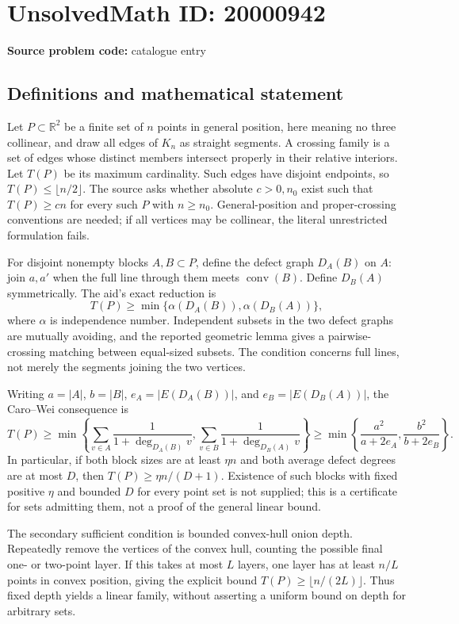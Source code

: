 \documentclass[11pt]{article}
\newcommand{\R}{\mathbb{R}}
\begin{document}
\section*{UnsolvedMath ID: 20000942}
\textbf{Source problem code:} catalogue entry
\subsection{Definitions and mathematical statement}
Let \(P\subset\R^2\) be a finite set of \(n\) points in general position, here meaning no three collinear, and draw all edges of \(K_n\) as straight segments. A crossing family is a set of edges whose distinct members intersect properly in their relative interiors. Let \(T(P)\) be its maximum cardinality. Such edges have disjoint endpoints, so \(T(P)\leq\lfloor n/2\rfloor\). The source asks whether absolute \(c>0,n_0\) exist such that \(T(P)\geq cn\) for every such \(P\) with \(n\geq n_0\). General-position and proper-crossing conventions are needed; if all vertices may be collinear, the literal unrestricted formulation fails.

For disjoint nonempty blocks \(A,B\subset P\), define the defect graph \(D_A(B)\) on \(A\): join \(a,a'\) when the full line through them meets \(\operatorname{conv}(B)\). Define \(D_B(A)\) symmetrically. The aid's exact reduction is
\[
 T(P)\geq\min\{\alpha(D_A(B)),\alpha(D_B(A))\},
\]
where \(\alpha\) is independence number. Independent subsets in the two defect graphs are mutually avoiding, and the reported geometric lemma gives a pairwise-crossing matching between equal-sized subsets. The condition concerns full lines, not merely the segments joining the two vertices.

Writing \(a=|A|\), \(b=|B|\), \(e_A=|E(D_A(B))|\), and \(e_B=|E(D_B(A))|\), the Caro--Wei consequence is
\[
 T(P)\geq\min\left\{\sum_{v\in A}\frac1{1+\deg_{D_A(B)}v},
 \sum_{v\in B}\frac1{1+\deg_{D_B(A)}v}\right\}
 \geq\min\left\{\frac{a^2}{a+2e_A},\frac{b^2}{b+2e_B}\right\}.
\]
In particular, if both block sizes are at least \(\eta n\) and both average defect degrees are at most \(D\), then \(T(P)\geq\eta n/(D+1)\). Existence of such blocks with fixed positive \(\eta\) and bounded \(D\) for every point set is not supplied; this is a certificate for sets admitting them, not a proof of the general linear bound.

The secondary sufficient condition is bounded convex-hull onion depth. Repeatedly remove the vertices of the convex hull, counting the possible final one- or two-point layer. If this takes at most \(L\) layers, one layer has at least \(n/L\) points in convex position, giving the explicit bound \(T(P)\geq\lfloor n/(2L)\rfloor\). Thus fixed depth yields a linear family, without asserting a uniform bound on depth for arbitrary sets.
\end{document}
